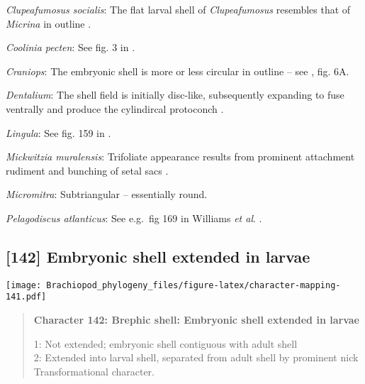 \documentclass[openany]{book}
\theoremstyle{definition}
\theoremstyle{definition}
\theoremstyle{definition}
\theoremstyle{remark}
\begin{document}
\hypertarget{Clupeafumosus_socialis-coding-141}{}
\emph{Clupeafumosus socialis}: The flat larval shell of
\emph{Clupeafumosus} resembles that of \emph{Micrina} in outline
\citetext{\citealp{Topper2013Reappraisalof}; \citealp[cf.][]{Holmer2011Firstrecord}}.

\hypertarget{Coolinia_pecten-coding-141}{}
\emph{Coolinia pecten}: See fig. 3 in
\citet{Bassett2017Earliestontogeny}.

\hypertarget{Craniops-coding-141}{}
\emph{Craniops}: The embryonic shell is more or less circular in outline
-- see \citet{Freeman1999Changesin}, fig. 6A.

\hypertarget{Dentalium-coding-141}{}
\emph{Dentalium}: The shell field is initially disc-like, subsequently
expanding to fuse ventrally and produce the cylindircal protoconch
\citep{Wanninger2001}.

\hypertarget{Lingula-coding-141}{}
\emph{Lingula}: See fig. 159 in \citet{Williams1997Introduction}.

\hypertarget{Mickwitzia_muralensis-coding-141}{}
\emph{Mickwitzia muralensis}: Trifoliate appearance results from
prominent attachment rudiment and bunching of setal sacs
\citep{Balthasar2009Thebrachiopod}.

\hypertarget{Micromitra-coding-141}{}
\emph{Micromitra}: Subtriangular -- essentially round.

\hypertarget{Pelagodiscus_atlanticus-coding-141}{}
\emph{Pelagodiscus atlanticus}: See e.g.~fig 169 in Williams \emph{et
al}. \citeyearpar{Williams1997Introduction}.

\subsection*{{[}142{]} Embryonic shell extended in
larvae}\label{embryonic-shell-extended-in-larvae}

\texttt{[image: Brachiopod\_phylogeny\_files/figure-latex/character-mapping-141.pdf]}

\begin{quote}
\textbf{Character 142: Brephic shell: Embryonic shell extended in
larvae}

1: Not extended; embryonic shell contiguous with adult shell\\
2: Extended into larval shell, separated from adult shell by prominent
nick\\
Transformational character.
\end{quote}
\end{document}
